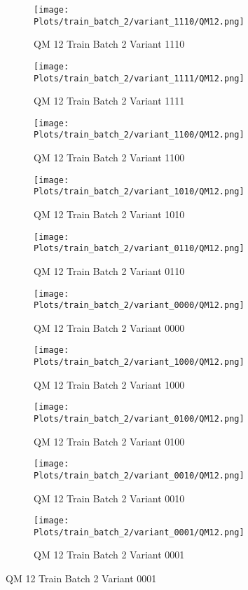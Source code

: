 \documentclass{DissertateFigs}
\begin{document}
\begin{figure}[t!]
    \begin{subfigure}{0.47\textwidth}
    \texttt{[image: Plots/train\_batch\_2/variant\_1110/QM12.png]}
    \caption{QM 12 Train Batch 2 Variant 1110}
    \end{subfigure}
    \begin{subfigure}{0.47\textwidth}
    \texttt{[image: Plots/train\_batch\_2/variant\_1111/QM12.png]}
    \caption{QM 12 Train Batch 2 Variant 1111}
    \end{subfigure}

\medskip

    \begin{subfigure}{0.47\textwidth}
    \texttt{[image: Plots/train\_batch\_2/variant\_1100/QM12.png]}
    \caption{QM 12 Train Batch 2 Variant 1100}
    \end{subfigure}
    \begin{subfigure}{0.47\textwidth}
    \texttt{[image: Plots/train\_batch\_2/variant\_1010/QM12.png]}
    \caption{QM 12 Train Batch 2 Variant 1010}
    \end{subfigure}

\medskip

    \begin{subfigure}{0.47\textwidth}
    \texttt{[image: Plots/train\_batch\_2/variant\_0110/QM12.png]}
    \caption{QM 12 Train Batch 2 Variant 0110}
    \end{subfigure}
    \begin{subfigure}{0.47\textwidth}
    \texttt{[image: Plots/train\_batch\_2/variant\_0000/QM12.png]}
    \caption{QM 12 Train Batch 2 Variant 0000}
    \end{subfigure}

\medskip

    \begin{subfigure}{0.47\textwidth}
    \texttt{[image: Plots/train\_batch\_2/variant\_1000/QM12.png]}
    \caption{QM 12 Train Batch 2 Variant 1000}
    \end{subfigure}
    \begin{subfigure}{0.47\textwidth}
    \texttt{[image: Plots/train\_batch\_2/variant\_0100/QM12.png]}
    \caption{QM 12 Train Batch 2 Variant 0100}
    \end{subfigure}

\medskip

    \begin{subfigure}{0.47\textwidth}
    \texttt{[image: Plots/train\_batch\_2/variant\_0010/QM12.png]}
    \caption{QM 12 Train Batch 2 Variant 0010}
    \end{subfigure}
    \begin{subfigure}{0.47\textwidth}
    \texttt{[image: Plots/train\_batch\_2/variant\_0001/QM12.png]}
    \caption{QM 12 Train Batch 2 Variant 0001}
    \end{subfigure}


\end{figure}
\end{document}

